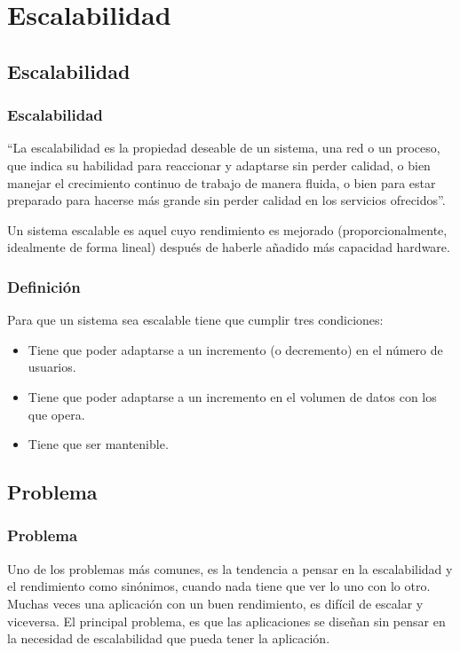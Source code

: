 \documentclass[12pt]{beamer}
\begin{document}
\section{Escalabilidad}
\subsection{Escalabilidad}

\begin{frame}
 \frametitle{Escalabilidad}
 ``La escalabilidad es la propiedad deseable de un sistema, una red o un proceso, que indica su habilidad para reaccionar y adaptarse sin perder calidad, o bien manejar el crecimiento continuo de trabajo de manera fluida, o bien para estar preparado para hacerse más grande sin perder calidad en los servicios ofrecidos''.

 \pause

 Un \alert{sistema escalable} es aquel cuyo rendimiento es mejorado (proporcionalmente, idealmente de forma lineal) después de haberle añadido más capacidad hardware.
\end{frame}


\begin{frame}
 \frametitle{Definición}
 Para que un sistema sea escalable tiene que cumplir tres condiciones:
 \begin{itemize}
  \item<2-> Tiene que poder adaptarse a un incremento (o decremento) en el número de usuarios. 
  \item<3-> Tiene que poder adaptarse a un incremento en el volumen de datos con los que opera.
  \item<4-> Tiene que ser \alert{mantenible}.
 \end{itemize}
\end{frame}


\subsection{Problema}

\begin{frame}
 \frametitle{Problema}
 Uno de los problemas más comunes, es la tendencia a pensar en la escalabilidad y el rendimiento como sinónimos, cuando \alert{nada} tiene que ver lo uno con lo otro. Muchas veces una aplicación con un buen rendimiento, es difícil de escalar y viceversa.
 \newline
 \pause
 El principal problema, es que las aplicaciones se diseñan sin pensar en la necesidad de escalabilidad que pueda tener la aplicación.
\end{frame}
\end{document}
